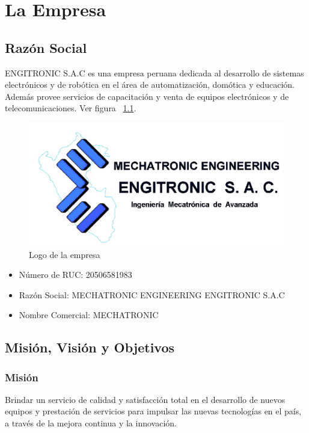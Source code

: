 \chapter{La Empresa}


\section{Razón Social}
ENGITRONIC S.A.C es una empresa peruana dedicada al desarrollo de sistemas electrónicos y de robótica en el área de automatización, domótica y educación. Además provee servicios de capacitación y venta de equipos electrónicos y de telecomunicaciones. Ver figura ~\ref{fig:logo}.

\begin{figure}[htb]
  \centering
  \includegraphics[scale=0.2]{images/engitronic.png}
  \caption{Logo de la empresa}
  \label{fig:logo}
\end{figure}

\begin{itemize}
  \item Número de RUC: 20506581983
  \item Razón Social: MECHATRONIC ENGINEERING ENGITRONIC S.A.C
  \item Nombre Comercial: MECHATRONIC
\end{itemize}


\section{Misión, Visión y Objetivos}

\subsection{Misión}
Brindar un servicio de calidad y satisfacción total en el desarrollo de nuevos equipos y prestación de servicios para impulsar las nuevas tecnologías en el país, a través de la mejora continua y la innovación.

